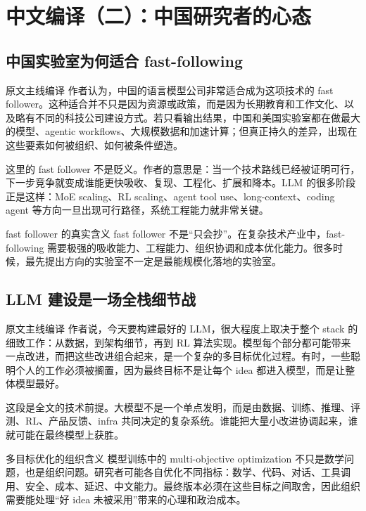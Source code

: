 \section{中文编译（二）：中国研究者的心态}

\subsection{中国实验室为何适合 fast-following}

\begin{translationbox}{原文主线编译}
作者认为，中国的语言模型公司非常适合成为这项技术的 fast follower。这种适合并不只是因为资源或政策，而是因为长期教育和工作文化、以及略有不同的科技公司建设方式。若只看输出结果，中国和美国实验室都在做最大的模型、agentic workflows、大规模数据和加速计算；但真正持久的差异，出现在这些要素如何被组织、如何被条件塑造。
\end{translationbox}

这里的 fast follower 不是贬义。作者的意思是：当一个技术路线已经被证明可行，下一步竞争就变成谁能更快吸收、复现、工程化、扩展和降本。LLM 的很多阶段正是这样：MoE scaling、RL scaling、agent tool use、long-context、coding agent 等方向一旦出现可行路径，系统工程能力就非常关键。

\begin{importantbox}{fast follower 的真实含义}
fast follower 不是``只会抄''。在复杂技术产业中，fast-following 需要极强的吸收能力、工程能力、组织协调和成本优化能力。很多时候，最先提出方向的实验室不一定是最能规模化落地的实验室。
\end{importantbox}

\subsection{LLM 建设是一场全栈细节战}

\begin{translationbox}{原文主线编译}
作者说，今天要构建最好的 LLM，很大程度上取决于整个 stack 的细致工作：从数据，到架构细节，再到 RL 算法实现。模型每个部分都可能带来一点改进，而把这些改进组合起来，是一个复杂的多目标优化过程。有时，一些聪明个人的工作必须被搁置，因为最终目标不是让每个 idea 都进入模型，而是让整体模型最好。
\end{translationbox}

这段是全文的技术前提。大模型不是一个单点发明，而是由数据、训练、推理、评测、RL、产品反馈、infra 共同决定的复杂系统。谁能把大量小改进协调起来，谁就可能在最终模型上获胜。

\begin{knowledgebox}{多目标优化的组织含义}
模型训练中的 multi-objective optimization 不只是数学问题，也是组织问题。研究者可能各自优化不同指标：数学、代码、对话、工具调用、安全、成本、延迟、中文能力。最终版本必须在这些目标之间取舍，因此组织需要能处理``好 idea 未被采用''带来的心理和政治成本。
\end{knowledgebox}

